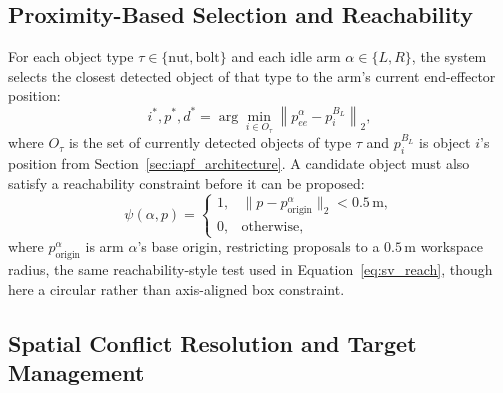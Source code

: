\subsection{Proximity-Based Selection and Reachability}\label{subsec:cta_proximity}

For each object type $\tau \in \{\text{nut}, \text{bolt}\}$ and each idle arm $\alpha \in \{L, R\}$,
the system selects the closest detected object of that type to the arm's current end-effector
position:
\begin{equation}
i^*, p^*, d^* = \arg\min_{i \in O_\tau} \left\lVert p_{ee}^\alpha - p^{B_L}_i \right\rVert_2,
\label{eq:cta_selection}
\end{equation}
where $O_\tau$ is the set of currently detected objects of type $\tau$ and $p_i^{B_L}$ is object
$i$'s position from Section~\ref{sec:iapf_architecture}. A candidate object must also satisfy a
reachability constraint before it can be proposed:
\begin{equation}
\psi(\alpha, p) =
\begin{cases}
1, & \lVert p - p_{\text{origin}}^\alpha \rVert_2 < 0.5\,\text{m}, \\
0, & \text{otherwise},
\end{cases}
\label{eq:cta_reachability}
\end{equation}
where $p_{\text{origin}}^\alpha$ is arm $\alpha$'s base origin, restricting proposals to a $0.5$\,m
workspace radius, the same reachability-style test used in Equation~\eqref{eq:sv_reach}, though here
a circular rather than axis-aligned box constraint.

\subsection{Spatial Conflict Resolution and Target Management}\label{subsec:cta_conflict}

